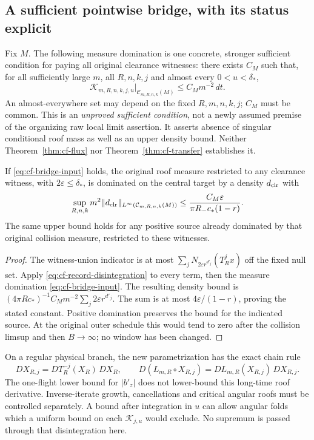 \subsection{A sufficient pointwise bridge, with its status explicit}
Fix $M$. The following measure domination is one concrete, stronger
sufficient condition for paying all original clearance witnesses:
there exists $C_M$ such that, for all sufficiently large $m$, all
$R,n,k,j$ and almost every $0<u<\delta_*$,
\begin{equation}\label{eq:cf-bridge-input}
 \mathcal K_{m,R,n,k,j,u}\big|_{\mathcal C_{m,R,n,k}(M)}
       \le C_M m^{-2}\,dt.
\end{equation}
An almost-everywhere set may depend on the fixed $R,m,n,k,j$;
$C_M$ must be common. This is an \emph{unproved sufficient condition},
not a newly assumed premise of the organizing raw local limit
assertion. It asserts absence of singular conditional roof mass as
well as an upper density bound. Neither Theorem~\ref{thm:cf-flux}
nor Theorem~\ref{thm:cf-transfer} establishes it.

\begin{proposition}
\label{prop:cf-bridge}
If \eqref{eq:cf-bridge-input} holds, the original roof measure
restricted to any clearance witness, with $2\varepsilon\le\delta_*$,
is dominated on the central target by a density $d_{\rm clr}$ with
\begin{equation}\label{eq:cf-bridge-consequence}
 \sup_{R,n,k}m^2\|d_{\rm clr}\|_{L^\infty(\mathcal C_{m,R,n,k}(M))}
       \le\frac{C_M\varepsilon}{\pi R_-c_*(1-r)}.
\end{equation}
The same upper bound holds for any positive source already dominated
by that original collision measure, restricted to these witnesses.
\end{proposition}
\begin{proof}
The witness-union indicator is at most
$\sum_jN_{2\varepsilon r^{d'_j}}(T_R^jx)$ off the fixed null set.
Apply \eqref{eq:cf-record-disintegration} to every term, then the
measure domination \eqref{eq:cf-bridge-input}. The resulting density
bound is $(4\pi Rc_*)^{-1}C_Mm^{-2}\sum_j2\varepsilon r^{d'_j}$.
The sum is at most $4\varepsilon/(1-r)$, proving the stated constant.
Positive domination preserves the bound for the indicated source.
At the original outer schedule this would tend to zero after the
collision limsup and then $B\to\infty$; no window has been changed.
\end{proof}
On a regular physical branch, the new parametrization has the exact
chain rule
\[
 D X_{R,j}=D T_R^{-j}(X_R)\,D X_R,\qquad
 D(L_{m,R}\circ X_{R,j})=D L_{m,R}(X_{R,j})\,D X_{R,j}.
\]
The one-flight lower bound for $|b'_z|$ does not lower-bound this
long-time roof derivative. Inverse-iterate growth, cancellations and
critical angular roofs must be controlled separately. A bound after
integration in $u$ can allow angular folds which a uniform bound on
each $\mathcal K_{j,u}$ would exclude. No supremum is passed through
that disintegration here.

